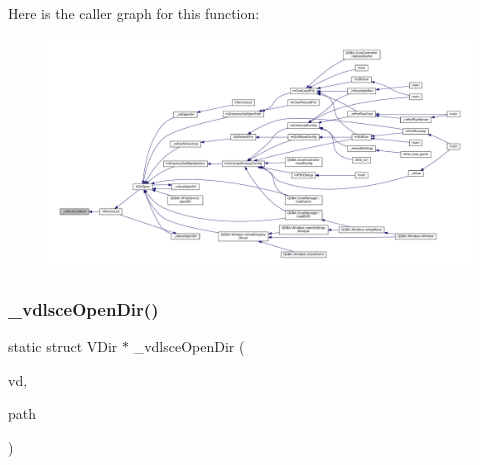 Here is the caller graph for this function\+:
\nopagebreak
\begin{figure}[H]
\begin{center}
\leavevmode
\includegraphics[width=350pt]{sce-vfs_8c_a645e5c55b04d294bac527dc0384a573b_icgraph}
\end{center}
\end{figure}
\mbox{\label{sce-vfs_8c_a0577478b314a3785a307d6ccfefb9627}} 
\subsubsection{\texorpdfstring{\+\_\+vdlsce\+Open\+Dir()}{\_vdlsceOpenDir()}}
{\footnotesize\ttfamily static struct V\+Dir $\ast$ \+\_\+vdlsce\+Open\+Dir (\begin{DoxyParamCaption}\item[{struct V\+Dir $\ast$}]{vd,  }\item[{const char $\ast$}]{path }\end{DoxyParamCaption})\hspace{0.3cm}{\ttfamily [static]}}

